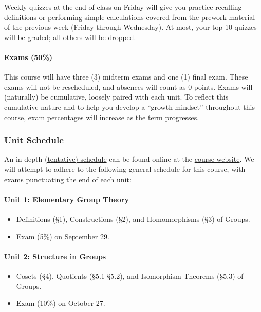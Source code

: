 \documentclass[
  twoside]{article}
\providecommand{\tightlist}{%
  \setlength{\itemsep}{0pt}\setlength{\parskip}{0pt}}
\begin{document}
Weekly quizzes at the end of class on Friday will give you practice
recalling definitions or performing simple calculations covered from the
prework material of the previous week (Friday through Wednesday). At
most, your top 10 quizzes will be graded; all others will be dropped.

\paragraph{Exams (50\%)}\label{exams-50}

This course will have three (3) midterm exams and one (1) final exam.
These exams will not be rescheduled, and absences will count as 0
points. Exams will (naturally) be cumulative, loosely paired with each
unit. To reflect this cumulative nature and to help you develop a
``growth mindset'' throughout this course, exam percentages will
increase as the term progresses.

\subsubsection{Unit Schedule}\label{unit-schedule}

An in-depth \href{../schedule.qmd}{(tentative) schedule} can be found
online at the \href{../index.qmd}{course website}. We will attempt to
adhere to the following general schedule for this course, with exams
punctuating the end of each unit:

\paragraph{Unit 1: Elementary Group
Theory}\label{unit-1-elementary-group-theory}

\begin{itemize}
\tightlist
\item
  Definitions (§1), Constructions (§2), and Homomorphisms (§3) of
  Groups.
\item
  Exam (5\%) on September 29.
\end{itemize}

\paragraph{Unit 2: Structure in
Groups}\label{unit-2-structure-in-groups}

\begin{itemize}
\tightlist
\item
  Cosets (§4), Quotients (§5.1-§5.2), and Isomorphism Theorems (§5.3) of
  Groups.
\item
  Exam (10\%) on October 27.
\end{itemize}
\end{document}

